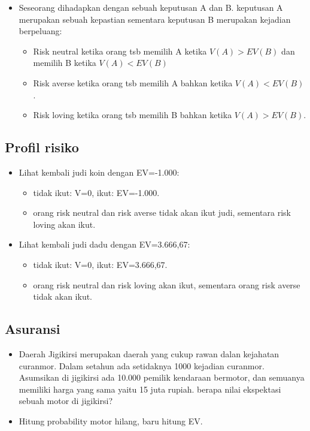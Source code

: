 \documentclass[
  letterpaper,
  DIV=11,
  numbers=noendperiod]{scrartcl}
\begin{document}
\begin{itemize}
\item
  Seseorang dihadapkan dengan sebuah keputusan A dan B. keputusan A
  merupakan sebuah kepastian sementara keputusan B merupakan kejadian
  berpeluang:

  \begin{itemize}
  \item
    Risk neutral ketika orang tsb memilih A ketika \(V(A)>EV(B)\) dan
    memilih B ketika \(V(A)<EV(B)\)
  \item
    Risk averse ketika orang tsb memilih A bahkan ketika \(V(A)<EV(B)\).
  \item
    Risk loving ketika orang tsb memilih B bahkan ketika \(V(A)>EV(B)\).
  \end{itemize}
\end{itemize}

\hypertarget{profil-risiko-1}{%
\subsection{Profil risiko}\label{profil-risiko-1}}

\begin{itemize}
\item
  Lihat kembali judi koin dengan EV=-1.000:

  \begin{itemize}
  \item
    tidak ikut: V=0, ikut: EV=-1.000.
  \item
    orang risk neutral dan risk averse tidak akan ikut judi, sementara
    risk loving akan ikut.
  \end{itemize}
\item
  Lihat kembali judi dadu dengan EV=3.666,67:

  \begin{itemize}
  \item
    tidak ikut: V=0, ikut: EV=3.666,67.
  \item
    orang risk neutral dan risk loving akan ikut, sementara orang risk
    averse tidak akan ikut.
  \end{itemize}
\end{itemize}

\hypertarget{asuransi}{%
\subsection{Asuransi}\label{asuransi}}

\begin{itemize}
\item
  Daerah Jigikirsi merupakan daerah yang cukup rawan dalan kejahatan
  curanmor. Dalam setahun ada setidaknya 1000 kejadian curanmor.
  Asumsikan di jigikirsi ada 10.000 pemilik kendaraan bermotor, dan
  semuanya memiliki harga yang sama yaitu 15 juta rupiah. berapa nilai
  ekspektasi sebuah motor di jigikirsi?
\item
  Hitung probability motor hilang, baru hitung EV.
\end{itemize}
\end{document}
